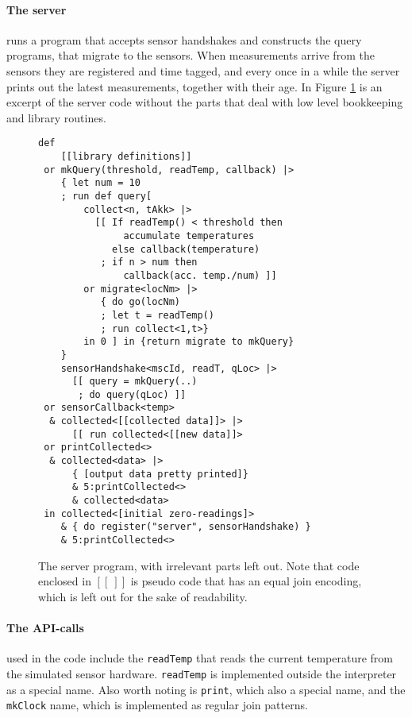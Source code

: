 \paragraph{The server} runs a program that accepts sensor handshakes and
constructs the query programs, that migrate to the sensors.  When measurements
arrive from the sensors they are registered and time tagged, and every once in
a while the server prints out the latest measurements, together with their age.
In Figure \ref{fig:server-prog} is an excerpt of the server code without the
parts that deal with low level bookkeeping and library routines.
\begin{figure}[!h]
\begin{minipage}{0.97\textwidth}
\begin{verbatim}
def
    [[library definitions]]
 or mkQuery(threshold, readTemp, callback) |>
    { let num = 10
    ; run def query[
        collect<n, tAkk> |>
          [[ If readTemp() < threshold then
               accumulate temperatures
             else callback(temperature)
           ; if n > num then
               callback(acc. temp./num) ]]
        or migrate<locNm> |>
           { do go(locNm)
           ; let t = readTemp()
           ; run collect<1,t>}
        in 0 ] in {return migrate to mkQuery}
    }
    sensorHandshake<mscId, readT, qLoc> |>
      [[ query = mkQuery(..)
       ; do query(qLoc) ]]
 or sensorCallback<temp>
  & collected<[[collected data]]> |>
      [[ run collected<[[new data]]>
 or printCollected<>
  & collected<data> |>
      { [output data pretty printed]}
      & 5:printCollected<>
      & collected<data>
 in collected<[initial zero-readings]>
    & { do register("server", sensorHandshake) }
    & 5:printCollected<>
\end{verbatim}
\end{minipage}
\caption{The server program, with irrelevant parts left out. Note that code
enclosed in $\left[ \left[\ \right] \right]$ is pseudo code that has an equal
join encoding, which is left out for the sake of readability.}
\label{fig:server-prog}
\end{figure}

\paragraph{The API-calls} used in the code include the \texttt{readTemp} that
reads the current temperature from the simulated sensor hardware.
\texttt{readTemp} is implemented outside the interpreter as a special name.
Also worth noting is \texttt{print}, which also a special name, and the
\texttt{mkClock} name, which is implemented as regular join patterns.

